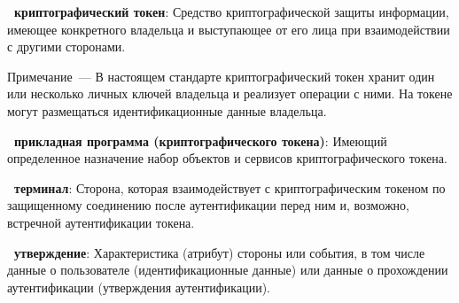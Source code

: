{\bf\thedefctr~криптографический токен}: 
Средство криптографической защиты информации, имеющее конкретного 
владельца и выступающее от его лица при взаимодействии с другими 
сторонами. 
%
\begin{note}
Примечание~--- В настоящем стандарте криптографический токен хранит один 
или несколько личных ключей владельца и реализует операции с ними.  
%
На токене могут размещаться идентификационные данные владельца. 
\end{note}

{\bf \thedefctr~прикладная программа (криптографического токена)}:
Имеющий определенное 
назначение набор объектов и сервисов криптографического токена. 

{\bf\thedefctr~терминал}: 
Сторона, которая взаимодействует с криптографическим токеном по 
защищенному соединению после аутентификации перед ним и, возможно, 
встречной аутентификации токена.

{\bf \thedefctr~утверждение}:
Характеристика (атрибут) стороны или события, 
в том числе данные о пользователе (идентификационные данные) 
или данные о прохождении аутентификации (утверждения аутентификации).



